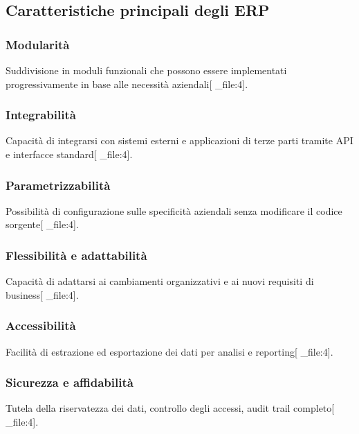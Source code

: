 \documentclass[12pt,a4paper]{article}
\begin{document}
\subsection{Caratteristiche principali degli ERP}

\subsubsection{Modularità}
Suddivisione in moduli funzionali che possono essere implementati progressivamente in base alle necessità aziendali[ _file:4].

\subsubsection{Integrabilità}
Capacità di integrarsi con sistemi esterni e applicazioni di terze parti tramite API e interfacce standard[ _file:4].

\subsubsection{Parametrizzabilità}
Possibilità di configurazione sulle specificità aziendali senza modificare il codice sorgente[ _file:4].

\subsubsection{Flessibilità e adattabilità}
Capacità di adattarsi ai cambiamenti organizzativi e ai nuovi requisiti di business[ _file:4].

\subsubsection{Accessibilità}
Facilità di estrazione ed esportazione dei dati per analisi e reporting[ _file:4].

\subsubsection{Sicurezza e affidabilità}
Tutela della riservatezza dei dati, controllo degli accessi, audit trail completo[ _file:4].
\end{document}
